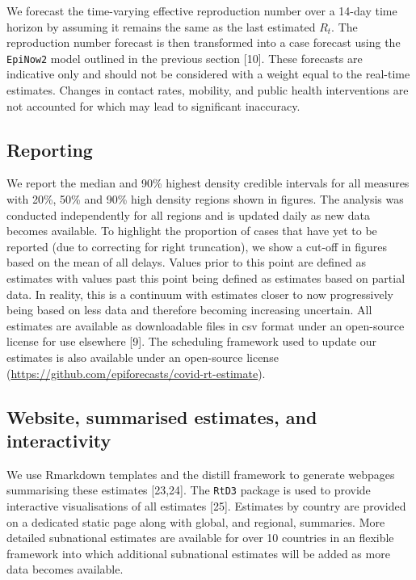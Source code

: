 \documentclass[
]{article}
\begin{document}
We forecast the time-varying effective reproduction number over a 14-day
time horizon by assuming it remains the same as the last estimated
\(R_t\). The reproduction number forecast is then transformed into a
case forecast using the \texttt{EpiNow2} model outlined in the previous
section {[}10{]}. These forecasts are indicative only and should not be
considered with a weight equal to the real-time estimates. Changes in
contact rates, mobility, and public health interventions are not
accounted for which may lead to significant inaccuracy.

\hypertarget{reporting}{%
\subsection{Reporting}\label{reporting}}

We report the median and 90\% highest density credible intervals for all
measures with 20\%, 50\% and 90\% high density regions shown in figures.
The analysis was conducted independently for all regions and is updated
daily as new data becomes available. To highlight the proportion of
cases that have yet to be reported (due to correcting for right
truncation), we show a cut-off in figures based on the mean of all
delays. Values prior to this point are defined as estimates with values
past this point being defined as estimates based on partial data. In
reality, this is a continuum with estimates closer to now progressively
being based on less data and therefore becoming increasing uncertain.
All estimates are available as downloadable files in csv format under an
open-source license for use elsewhere {[}9{]}. The scheduling framework
used to update our estimates is also available under an open-source
license (\url{https://github.com/epiforecasts/covid-rt-estimate}).

\hypertarget{website-summarised-estimates-and-interactivity}{%
\subsection{Website, summarised estimates, and
interactivity}\label{website-summarised-estimates-and-interactivity}}

We use Rmarkdown templates and the distill framework to generate
webpages summarising these estimates {[}23,24{]}. The \texttt{RtD3}
package is used to provide interactive visualisations of all estimates
{[}25{]}. Estimates by country are provided on a dedicated static page
along with global, and regional, summaries. More detailed subnational
estimates are available for over 10 countries in an flexible framework
into which additional subnational estimates will be added as more data
becomes available.
\end{document}
